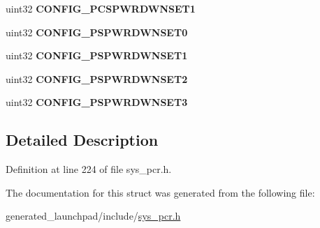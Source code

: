 \begin{DoxyCompactItemize}
uint32 {\bfseries C\+O\+N\+F\+I\+G\+\_\+\+P\+C\+S\+P\+W\+R\+D\+W\+N\+S\+E\+T1}
\item 
\mbox{\label{structpcr__config__reg_a424d0c346631f6262163a3d5d71a1934}} 
uint32 {\bfseries C\+O\+N\+F\+I\+G\+\_\+\+P\+S\+P\+W\+R\+D\+W\+N\+S\+E\+T0}
\item 
\mbox{\label{structpcr__config__reg_ac86cfcbb1653b7fa8634963a50d302d3}} 
uint32 {\bfseries C\+O\+N\+F\+I\+G\+\_\+\+P\+S\+P\+W\+R\+D\+W\+N\+S\+E\+T1}
\item 
\mbox{\label{structpcr__config__reg_ad6531d074c6475fa21038ee595447d8f}} 
uint32 {\bfseries C\+O\+N\+F\+I\+G\+\_\+\+P\+S\+P\+W\+R\+D\+W\+N\+S\+E\+T2}
\item 
\mbox{\label{structpcr__config__reg_a3732e745fb470f4486679834f6fef761}} 
uint32 {\bfseries C\+O\+N\+F\+I\+G\+\_\+\+P\+S\+P\+W\+R\+D\+W\+N\+S\+E\+T3}
\end{DoxyCompactItemize}


\subsection{Detailed Description}


Definition at line 224 of file sys\+\_\+pcr.\+h.



The documentation for this struct was generated from the following file\+:\begin{DoxyCompactItemize}
\item 
generated\+\_\+launchpad/include/\mbox{\hyperlink{sys__pcr_8h}{sys\+\_\+pcr.\+h}}\end{DoxyCompactItemize}
